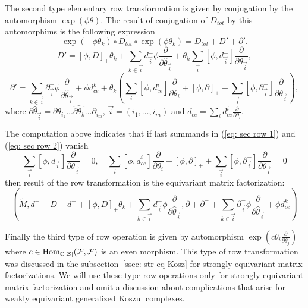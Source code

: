 The second type elementary row transformation is given by conjugation by the automorphism $\exp(\phi\theta)$. The result of conjugation of $D_{tot}$ by this automorphims is the following expression
$$ \exp(-\phi\theta_k)\circ D_{tot}\circ\exp(\phi\theta_k)=D_{tot}+D'+\partial'.$$
\begin{equation}\label{eq: sec row 1}
D'=[\phi,D]_+\theta_k+\sum_{k\in \vec{i} }d^-_{\vec{i}}\phi\frac{\partial}{\partial\widehat{\theta}_{\vec{i}}}+\theta_k\sum_{\vec{i}}[\phi,d^-_{\vec{i}}]\frac{\partial}{\partial\theta_{\vec{i}}},
\end{equation}
\begin{equation}\label{eq: sec row 2}
\partial'=\sum_{k\in \vec{i} }\partial^-_{\vec{i}}\phi\frac{\partial}{\partial\widehat{\theta}_{\vec{i}}}+\phi d_{ce}^k+
\theta_k(\sum_i[\phi,d_{ce}^i]\frac{\partial}{\partial\theta_i}+[\phi,\partial]_+ +\sum_{\vec{i}}[\phi,\partial^-_{\vec{i}}]\frac{\partial}{\partial\theta_{\vec{i}}}),
\end{equation}
where $\partial\widehat{\theta}_{\vec{i}}=\partial \theta_{i_1}\dots \widehat{\partial\theta_k}\dots\partial_{i_m}$, $\vec{i}=(i_1,\dots,i_m)$ and
$d_{ce}=\sum_i d_{ce}^i\frac{\partial}{\partial \theta_i}.$

The computation above indicates that if last summands in (\ref{eq: sec row 1}) and (\ref{eq: sec row 2}) vanish
\begin{equation}\label{eq: adm row tr}
\sum_{\vec{i}}[\phi,d^-_{\vec{i}}]\frac{\partial}{\partial\theta_{\vec{i}}}=0,\quad \sum_i[\phi,d_{ce}^i]\frac{\partial}{\partial\theta_i}+[\phi,\partial]_+ +\sum_{\vec{i}}[\phi,\partial^-_{\vec{i}}]\frac{\partial}{\partial\theta_{\vec{i}}}=0
\end{equation}
 then result of the row transformation is the equivariant matrix factorization:
 $$(\tilde{M},d^++D+d^-+[\phi,D]_+\theta_k+\sum_{k\in \vec{i} }d^-_{\vec{i}}\phi\frac{\partial}{\partial\widehat{\theta}_{\vec{i}}},\partial+\partial^-+\sum_{k\in \vec{i} }\partial^-_{\vec{i}}\phi\frac{\partial}{\partial\widehat{\theta}_{\vec{i}}}+\phi d_{ce}^k)$$

Finally the third type of row operation is given by automorphism $\exp(c\theta_i\frac{\partial}{\partial\theta_j})$ where $c\in \mathop{{\rm Hom}}\nolimits_{\mathbb{C}[\mathcal{Z}]}(\mathcal{F},\mathcal{F})$ is an even morphism. This type of row transformation
was discussed in the subsection~\ref{ssec: str eq Kosz} for strongly equivariant matrix factorizations.
 We will use these type row operations only for strongly equivariant matrix factorization and omit a discussion
about complications that arise for weakly  equivariant generalized Koszul complexes.


